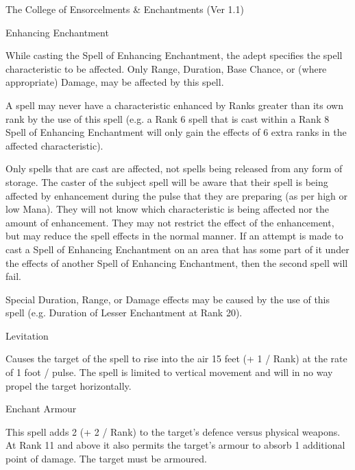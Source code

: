 \begin{Chapter}{The College of Ensorcelments \& Enchantments (Ver 1.1)}
\begin{spell}[S-7]{Enhancing Enchantment}
\begin{effects}
While casting the Spell of Enhancing Enchantment, the adept specifies
the spell characteristic to be affected.  Only Range, Duration, Base
Chance, or (where appropriate) Damage, may be affected by this spell.

A spell may never have a characteristic enhanced by Ranks greater than
its own rank by the use of this spell (e.g. a Rank 6 spell that is
cast within a Rank 8 Spell of Enhancing Enchantment will only gain the
effects of 6 extra ranks in the affected characteristic).

Only spells that are cast are affected, not spells being released from
any form of storage.  The caster of the subject spell will be aware
that their spell is being affected by enhancement during the pulse
that they are preparing (as per high or low Mana). They will not know
which characteristic is being affected nor the amount of enhancement.
They may not restrict the effect of the enhancement, but may reduce
the spell effects in the normal manner. If an attempt is made to
cast a Spell of Enhancing Enchantment on an area that has some part of
it under the effects of another Spell of Enhancing Enchantment, then
the second spell will fail.

Special Duration, Range, or Damage effects may be caused by the use of
this spell (e.g. Duration of Lesser Enchantment at Rank 20).
\end{effects}
\end{spell}

\begin{spell}[S-8]{Levitation}

\begin{effects}
Causes the target of the spell to rise into the air 15 feet (+ 1 /
Rank) at the rate of 1 foot / pulse.  The spell is limited to vertical
movement and will in no way propel the target horizontally.
\end{effects}
\end{spell}

\begin{spell}[S-9]{Enchant Armour}

\begin{effects}
This spell adds 2 (+ 2 / Rank) to the target’s defence versus physical
weapons.  At Rank 11 and above it also permits the target’s armour to
absorb 1 additional point of damage.  The target must be armoured.
\end{effects}
\end{spell}


\end{Chapter}
